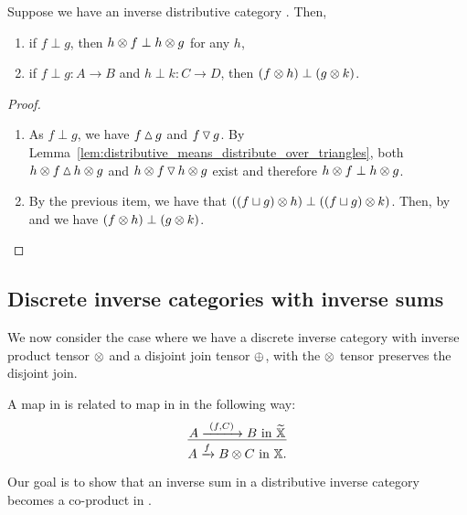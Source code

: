 \begin{corollary}\label{cor:inverse_product_and_disjointness}
  Suppose we have an inverse distributive category \X. Then,
  \begin{enumerate}[{(}i{)}]
    \item if $f \perp g$, then $h\otimes f \perp h\otimes  g$ for any $h$,
    \item  if  $f\perp g : A\to B$ and $h \perp k: C\to D$, then $(f\otimes h)\perp (g\otimes k)$.
   \end{enumerate}
\end{corollary}
\begin{proof}
  \prepprooflist
  \begin{enumerate}[{(}i{)}]
    \item As $f\perp g$, we have $f\operatorname{\vartriangle} g$ and $f\operatorname{\triangledown} g$. By
      Lemma~\ref{lem:distributive_means_distribute_over_triangles}, both $h\otimes f \operatorname{\vartriangle} h\otimes g$ and
      $h\otimes f \operatorname{\triangledown} h\otimes g$ exist and therefore $h\otimes f \perp h\otimes g$.
    \item By the previous item, we have that $((f\sqcup g)\otimes h) \perp ((f\sqcup g)\otimes k)$. Then, by
       and  we have $(f\otimes h)\perp (g\otimes k)$.
  \end{enumerate}
\end{proof}

\subsection{Discrete inverse categories with inverse sums} %
\label{sub:discrete_inverse_categories_with_inverse_sums}

We now consider the case where we have a discrete inverse category with inverse product
tensor $\otimes$ and a disjoint join tensor $\oplus$, with the $\otimes$ tensor preserves the
disjoint join.

A map in \Xt is related to map in \X in the following way:
\[
  \infer{A\xrightarrow{f} B\*C \text{ in }\X.}{A \xrightarrow{\ (f,C)\ } B \text{ in } \Xt}
\]

Our goal is to show that an inverse sum in a distributive inverse category becomes a co-product
in \Xt.

